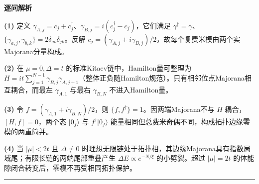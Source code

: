 \documentclass[UTF8,a4paper,11pt,oneside,openany]{ctexbook}
\begin{document}
\par\medskip\noindent\textbf{逐问解析}
\par\noindent\textbf{(1)} 定义 \(\gamma_{A,j}=c_j+c_j^\dagger\)、\(\gamma_{B,j}=i(c_j^\dagger-c_j)\)，它们满足 \(\gamma^\dagger=\gamma\)、\(\{\gamma_{a,j},\gamma_{b,k}\}=2\delta_{ab}\delta_{jk}\)。反解 \(c_j=(\gamma_{A,j}+i\gamma_{B,j})/2\)，故每个复费米模由两个实Majorana分量构成。
\par\noindent\textbf{(2)} 在 \(\mu=0,\Delta=t\) 的标准Kitaev链中，Hamilton量可整理为 \(H=it\sum_{j=1}^{N-1}\gamma_{B,j}\gamma_{A,j+1}\)（整体正负随Hamilton规范）。只有相邻位点Majorana相互耦合，而最左 \(\gamma_{A,1}\) 与最右 \(\gamma_{B,N}\) 不进入Hamilton量。
\par\noindent\textbf{(3)} 令 \(f=(\gamma_{A,1}+i\gamma_{B,N})/2\)，则 \(\{f,f^\dagger\}=1\)。因两端Majorana不与 \(H\) 耦合，\([H,f]=0\)，两个态 \(|0_f\rangle\) 与 \(f^\dagger|0_f\rangle\) 能量相同但总费米奇偶不同，构成拓扑边缘零模的两重简并。
\par\noindent\textbf{(4)} 当 \(|\mu|<2t\) 且 \(\Delta\ne0\) 时理想无限链处于拓扑相，其边缘Majorana具有指数局域尾；有限长链的两端尾部重叠产生 \(\Delta E\propto e^{-N/\xi}\) 的小劈裂。超过 \(|\mu|=2t\) 的体能隙闭合转变后，零模不再受相同拓扑保护。

\par\bigskip\hrule\bigskip
\end{document}
